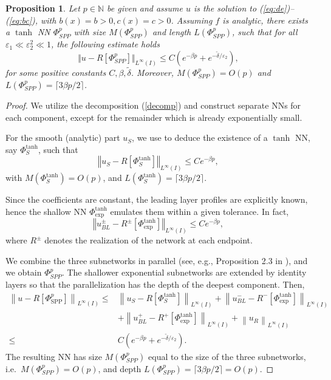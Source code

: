 \documentclass[11pt]{article}
\providecommand{\e}{\varepsilon}
\newcommand{\ceil}[1]{\lceil #1 \rceil}
\theoremstyle{plain}
\newtheorem{proposition}[theorem]{Proposition}
\theoremstyle{definition}
\theoremstyle{remark}
\numberwithin{equation}{section}
\begin{document}
\begin{proposition}\label{prop:NNbl}
Let $p \in \mathbb{N}$ be given and assume $u$ is the solution to (\ref{eq:de})--(\ref{eq:bc}), with $b(x)=b>0, c(x) = c >0$. Assuming $f$ is analytic, there exists a $\tanh$ NN $\Phi^{p}_{{SPP}}$ with size $M(\Phi^{p}_{{SPP}})$ and length $L(\Phi^{p}_{{SPP}})$, such that for all $\e_1 \ll \e_2^2 \ll 1$, the following estimate holds
%
$$
\Vert u - R[\Phi^{p}_{SPP}] \Vert_{L^{\infty}(I)} \leq C \left( e^{-\beta p} + e^{-\tilde{\delta} / \varepsilon_2} \right),
$$
for some positive constants $C, \beta, \tilde{\delta}$. Moreover, $M(\Phi^p_{SPP}) = O(p)$ and $L(\Phi^{p}_{{SPP}})= \ceil{3 \beta p/2}$.
\end{proposition}
%
\begin{proof}
We utilize the decomposition (\ref{decomp}) and construct separate NNs for each component, except for the remainder which is already exponentially small.

For the smooth (analytic) part $u_S$, we use \cite[Cor. 5.8]{Mishra} to deduce the existence of a $\tanh$ NN, say $\Phi^{\tanh}_S$, such that 
$$
\left\Vert u_S - R\left[\Phi^{\tanh}_{S}\right] \right\Vert_{L^{\infty}(I)} \leq C e^{-\beta p},
$$
with $M(\Phi^{\tanh}_S) = O(p)$, and $L(\Phi^{\tanh}_S) = \ceil{3 \beta p/2}$.

Since the coefficients are constant, the leading layer profiles are explicitly known, hence the shallow NN $\Phi^{\tanh}_{\text{exp}}$ emulates them within a given tolerance. In fact,
%
$$
\left\Vert u^{\pm}_{BL} - R^{\pm}\left[\Phi^{\tanh}_{\text{exp}}\right] \right\Vert_{L^{\infty}(I)} \leq C e^{-\beta p},
$$
where $R^{\pm}$ denotes the realization of the network at each endpoint.

We combine the three subnetworks in parallel (see, e.g., Proposition 2.3 in \cite{OPS}), and we obtain $\Phi^p_{SPP}$. The shallower exponential subnetworks are extended by identity layers so that the parallelization has the depth of the deepest component. Then,
$$
\begin{aligned}
\left\|u-R\left[\Phi_{\mathrm{SPP}}^p\right]\right\|_{L^{\infty}(I)} \leq & \left\|u_S-R\left[\Phi^{\tanh}_S\right]\right\|_{L^{\infty}(I)}+\left\|u_{BL}^{-}-R^{-}\left[\Phi_{\text{exp}}^{\tanh}\right]\right\|_{L^{\infty}(I)} \\
& +\left\|u_{BL}^{+}-R^{+}\left[\Phi_{\text{exp}}^{\tanh}\right]\right\|_{L^{\infty}(I)}+\left\|u_R\right\|_{L^{\infty}(I)} \\
\leq & C\left(e^{-\beta p}+e^{-\tilde{\delta} / \varepsilon_2}\right) .
\end{aligned}
$$
The resulting NN has size $M(\Phi_{SPP}^p)$ equal to the size of the three subnetworks, i.e.~$M(\Phi_{SPP}^p)=O(p)$,
and depth $L(\Phi_{SPP}^p) = \ceil{3 \beta p/2}=O(p)$.
\end{proof}
\end{document}
